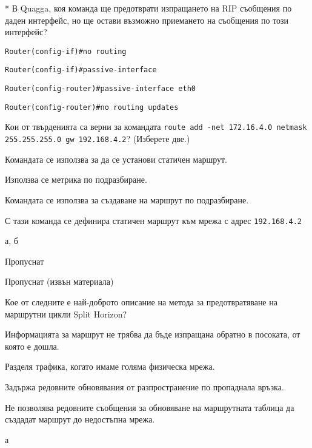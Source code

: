 \begin{q}{*}
  В Quagga, коя команда ще предотврати изпращането на RIP съобщения по даден
  интерфейс, но ще остави възможно приемането на съобщения по този интерфейс?

  \begin{defractors}
  \item \texttt{Router(config-if)\#no routing}
  \item \texttt{Router(config-if)\#passive-interface}
  \item \texttt{Router(config-router)\#passive-interface eth0}
  \item \texttt{Router(config-router)\#no routing updates}
  \end{defractors}
\end{q}

\begin{q}
  Кои от твърденията са верни за командата \texttt{route add -net 172.16.4.0
    netmask 255.255.255.0 gw 192.168.4.2}? (Изберете две.)

  \begin{defractors}

  \item Командата се използва за да се установи статичен маршрут.
  \item Използва се метрика по подразбиране.
  \item Командата се използва за създаване на маршрут по подразбиране.
  \item С тази команда се дефинира статичен маршрут към мрежа с адрес
    \texttt{192.168.4.2}
  \end{defractors}

  \rans а, б
\end{q}

\begin{q}
  Пропуснат
\end{q}

\begin{q}
  Пропуснат (извън материала)
\end{q}

\begin{q}
  Кое от следните е най-доброто описание на метода за предотвратяване на
  маршрутни цикли Split Horizon?

  \begin{defractors}

  \item Информацията за маршрут не трябва да бъде изпращана обратно в посоката,
    от която е дошла.
  \item Разделя трафика, когато имаме голяма физическа мрежа.
  \item Задържа редовните обновявания от разпространение по пропаднала връзка.
  \item Не позволява редовните съобщения за обновяване на маршрутната таблица да
    създадат маршрут до недостъпна мрежа.
  \end{defractors}

  \rans а
\end{q}

